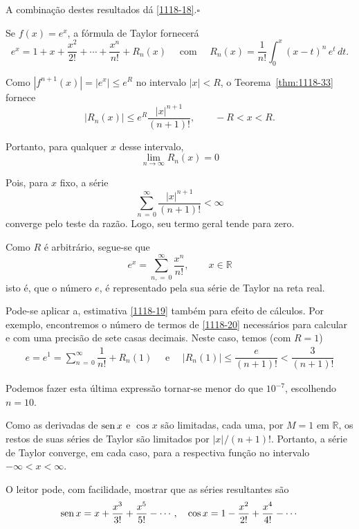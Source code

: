 A combinação destes resultados dá \eqref{1118-18}.\hfill $\square$

\begin{exer}\label{exem-2}
Se $f(x)= e^x$, a fórmula de Taylor fornecerá
\begin{equation*}
 e^x=1+ x + \frac{x^2}{2!}+\cdots+\dfrac{x^n}{n!} + R_n(x) \quad 
 \text{ com }\quad  R_n(x)=\dfrac{1}{n!}\int_0^x (x-t)^n\,e^t\, dt.
\end{equation*}

Como $|f^{n+1}(x)| =|e^x|\leq e^R$ no intervalo $|x| < R$, o Teorema~\ref{thm:1118-33} fornece
\begin{equation}\label{1118-19}
|R_n(x)|\leq e^R\frac{|x|^{n+1}}{(n+1)!},\qquad -R<x<R.
\end{equation}

Portanto, para qualquer $x$ desse intervalo,
\begin{equation*}
  \lim_{n\to\infty} R_n(x) = 0
\end{equation*}

Pois, para $x$ fixo, a série
\begin{equation*}
  \sum_{n\, =\, 0}^{\infty}\dfrac{|x|^{n+1}}{(n+1)!} < \infty
\end{equation*}
converge pelo teste da razão. Logo, seu termo geral tende para zero.

Como $R$ é arbitrário, segue-se que
\begin{equation}\label{1118-20}
e^x=\sum_{n, =\, 0 }^{\infty}\frac{x^n}{n!},\qquad x\in \mathbb{R}
\end{equation}
isto é, que o número $e$, é representado pela sua série de Taylor
na reta real.
\end{exer}

Pode-se aplicar a, estimativa \eqref{1118-19} também para efeito de cálculos. Por exemplo, encontremos o 
número de termos de \eqref{1118-20} necessários para calcular e com uma precisão de
sete casas decimais. Neste caso, temos (com $R = 1$)
\begin{align*}
e = e^1=\sum_{n\, =\, 0}^{\infty}\dfrac{1}{n!} +R_n(1) \quad \text{ e } 
\quad |R_n(1)|\leq \dfrac{e}{(n+1)!} < \dfrac{3}{(n+1)!}
\end{align*}


Podemos fazer esta última expressão tornar-se menor do que $10^{-7}$, escolhendo $n = 10$.

\begin{exer} 
Como as derivadas de $\operatorname{sen} x$ e $\cos x$ são limitadas,
cada uma, por $M = 1$ em $\mathbb{R}$, os restos de suas séries de
Taylor são limitados por $|x|^{}/(n + 1)!$. Portanto, a série de
Taylor converge, em cada caso, para a respectiva função no
intervalo $-\infty < x < \infty$.

O leitor pode, com facilidade, mostrar que as séries resultantes são
\begin{equation*}
\operatorname{sen} x =  x +\dfrac{x^3}{3!} +\dfrac{x^5}{5!}-\cdots,\quad 
\cos x =1-\dfrac{x^2}{2!}+\dfrac{x^4}{4!}-\cdots
\end{equation*}
\end{exer}

